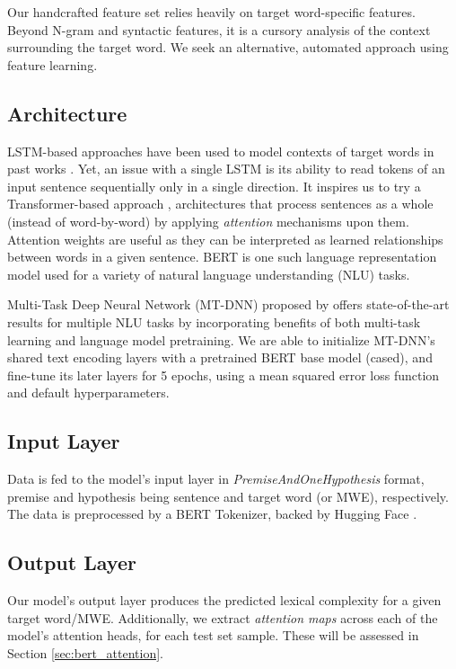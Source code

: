 \documentclass{dcthesis}
\theoremstyle{definition}
\theoremstyle{remark}
\begin{document}
Our handcrafted feature set relies heavily on target word-specific features. Beyond N-gram and syntactic features, it is a cursory analysis of the context surrounding the target word. We seek an alternative, automated approach using feature learning.

\subsection{Architecture}

LSTM-based approaches have been used to model contexts of target words in past works \citep{hartmanndossantos2018nilc, dehertogtack2018deep}. Yet, an issue with a single LSTM is its ability to read tokens of an input sentence sequentially only in a single direction. It inspires us to try a Transformer-based approach \citep{DBLP:journals/corr/VaswaniSPUJGKP17}, architectures that process sentences as a whole (instead of word-by-word) by applying \textit{attention} mechanisms upon them. Attention weights are useful as they can be interpreted as learned relationships between words in a given sentence. BERT \citep{DBLP:journals/corr/abs-1810-04805} is one such language representation model used for a variety of natural language understanding (NLU) tasks.

Multi-Task Deep Neural Network (MT-DNN) proposed by \citet{liuetal2019multitask} offers state-of-the-art results for multiple NLU tasks by incorporating benefits of both multi-task learning and language model pretraining. We are able to initialize MT-DNN's shared text encoding layers with a pretrained BERT base model (cased), and fine-tune its later layers for 5 epochs, using a mean squared error loss function and default hyperparameters.

\subsection{Input Layer}

Data is fed to the model's input layer in \textit{PremiseAndOneHypothesis} format, premise and hypothesis being sentence and target word (or MWE), respectively. The data is preprocessed by a BERT Tokenizer, backed by Hugging Face \citep{wolf_etal_2020_transformers}.

\subsection{Output Layer}

Our model's output layer produces the predicted lexical complexity for a given target word/MWE. Additionally, we extract \textit{attention maps} across each of the model's attention heads, for each test set sample. These will be assessed in Section \ref{sec:bert_attention}.
\end{document}

